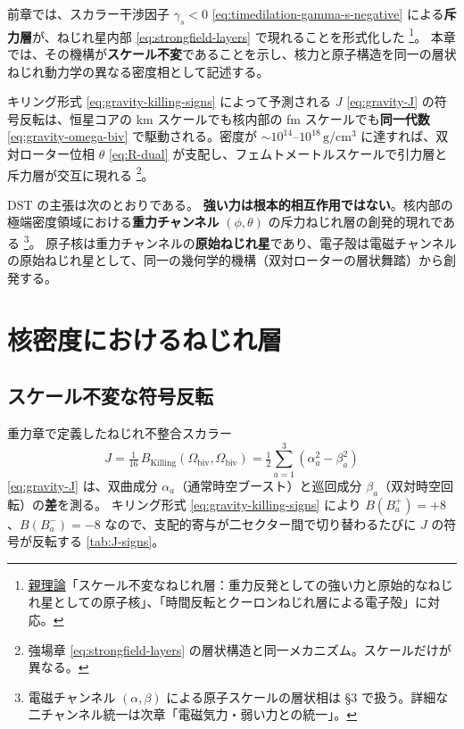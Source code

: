 \documentclass[dvipdfmx,a4paper,oneside]{jsbook}
\numberwithin{equation}{chapter}
\begin{document}
前章では、スカラー干渉因子 \(\gamma_s < 0\) \eqref{eq:timedilation-gamma-s-negative} による\textbf{斥力層}が、ねじれ星内部 \eqref{eq:strongfield-layers} で現れることを形式化した \footnote{\hyperref[sec:sister-manuscripts]{親理論}「スケール不変なねじれ層：重力反発としての強い力と原始的なねじれ星としての原子核」、「時間反転とクーロンねじれ層による電子殻」に対応。}。
本章では、その機構が\textbf{スケール不変}であることを示し、核力と原子構造を同一の層状ねじれ動力学の異なる密度相として記述する。

キリング形式 \eqref{eq:gravity-killing-signs} によって予測される \(J\) \eqref{eq:gravity-J} の符号反転は、恒星コアの km スケールでも核内部の fm スケールでも\textbf{同一代数} \eqref{eq:gravity-omega-biv} で駆動される。密度が \(\sim 10^{14}\)–\(10^{18}\,\mathrm{g/cm^3}\) に達すれば、双対ローター位相 \(\theta\) \eqref{eq:R-dual} が支配し、フェムトメートルスケールで引力層と斥力層が交互に現れる \footnote{強場章 \eqref{eq:strongfield-layers} の層状構造と同一メカニズム。スケールだけが異なる。}。

DST の主張は次のとおりである。
\textbf{強い力は根本的相互作用ではない}。核内部の極端密度領域における\textbf{重力チャンネル} \((\phi, \theta)\) の斥力ねじれ層の創発的現れである \footnote{電磁チャンネル \((\alpha, \beta)\) による原子スケールの層状相は §3 で扱う。詳細な二チャンネル統一は次章「電磁気力・弱い力との統一」。}。
原子核は重力チャンネルの\textbf{原始ねじれ星}であり、電子殻は電磁チャンネルの原始ねじれ星として、同一の幾何学的機構（双対ローターの層状舞踏）から創発する。

\section{核密度におけるねじれ層}

\subsection{スケール不変な符号反転}

重力章で定義したねじれ不整合スカラー
\begin{equation}
  J = \tfrac{1}{16}\, B_{\mathrm{Killing}}(\Omega_{\mathrm{biv}}, \Omega_{\mathrm{biv}})
  = \tfrac{1}{2}\sum_{a=1}^{3}(\alpha_a^{2} - \beta_a^{2})
  \label{eq:nuclear-J-reminder}
\end{equation}
\eqref{eq:gravity-J} は、双曲成分 \(\alpha_a\)（通常時空ブースト）と巡回成分 \(\beta_a\)（双対時空回転）の\textbf{差}を測る。
キリング形式 \eqref{eq:gravity-killing-signs} により \(B(B_a^{+}) = +8\)、\(B(B_a^{-}) = -8\) なので、支配的寄与が二セクター間で切り替わるたびに \(J\) の符号が反転する \eqref{tab:J-signs}。
\end{document}
